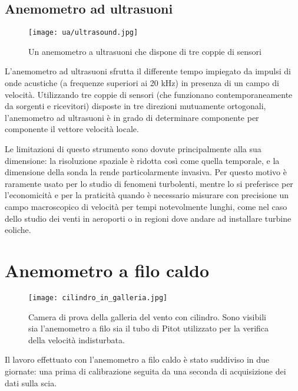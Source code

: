 \documentclass{article} %
\begin{document}
\subsection{Anemometro ad ultrasuoni}
\begin{figure}[ht!]
	\centering
	\texttt{[image: ua/ultrasound.jpg]}
	\caption{Un anemometro a ultrasuoni che dispone di tre coppie di sensori}
\end{figure}
L'anemometro ad ultrasuoni sfrutta il differente tempo impiegato da impulsi di onde acustiche (a frequenze superiori ai 20 kHz) in presenza di un campo di velocità. Utilizzando tre coppie di sensori (che funzionano contemporaneamente da sorgenti e ricevitori) disposte in tre direzioni mutuamente ortogonali, l'anemometro ad ultrasuoni è in grado di determinare componente per componente il vettore velocità locale.\par
Le limitazioni di questo strumento sono dovute principalmente alla sua dimensione: la risoluzione spaziale è ridotta così come quella temporale, e la dimensione della sonda la rende particolarmente invasiva. Per questo motivo è raramente usato per lo studio di fenomeni turbolenti, mentre lo si preferisce per l'economicità e per la praticità quando è necessario misurare con precisione un campo macroscopico di velocità per tempi notevolmente lunghi, come nel caso dello studio dei venti in aeroporti o in regioni dove andare ad installare turbine eoliche.
\newpage
\section{Anemometro a filo caldo}
\begin{figure}[htbp]
	\centering
	\texttt{[image: cilindro\_in\_galleria.jpg]}
	\caption{Camera di prova della galleria del vento con cilindro. Sono visibili sia l'anemometro a filo sia il tubo di Pitot utilizzato per la verifica della velocità indisturbata.}
\end{figure}
Il lavoro effettuato con l'anemometro a filo caldo è stato suddiviso in due giornate: una prima di calibrazione seguita da una seconda di acquisizione dei dati sulla scia.
\end{document}
